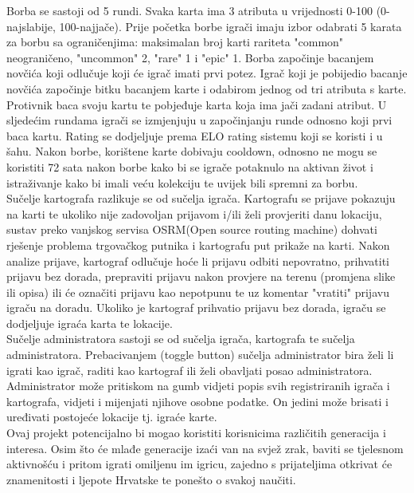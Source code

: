		\textnormal{Borba se sastoji od 5 rundi. Svaka karta ima 3 atributa u vrijednosti 0-100 (0-najslabije, 100-najjače). Prije početka borbe igrači imaju izbor odabrati 5 karata za borbu sa ograničenjima: maksimalan broj karti rariteta "common" neograničeno, "uncommon" 2, "rare" 1 i "epic" 1. Borba započinje bacanjem novčića koji odlučuje koji će igrač imati prvi potez. Igrač koji je pobijedio bacanje novčića započinje bitku bacanjem karte i odabirom jednog od tri atributa s karte. Protivnik baca svoju kartu te pobjeđuje karta koja ima jači zadani atribut. U sljedećim rundama igrači se izmjenjuju u započinjanju runde odnosno koji prvi baca kartu. Rating se dodjeljuje prema ELO rating sistemu koji se koristi i u šahu.}
		\textnormal{Nakon borbe, korištene karte dobivaju cooldown, odnosno ne mogu se koristiti 72 sata nakon borbe kako bi se igrače potaknulo na aktivan život i istraživanje kako bi imali veću kolekciju te uvijek bili spremni za borbu.}\\
		
		\textnormal{Sučelje kartografa razlikuje se od sučelja igrača. Kartografu se prijave pokazuju na karti te ukoliko nije zadovoljan prijavom i/ili želi provjeriti danu lokaciju, sustav preko vanjskog servisa OSRM(Open source routing machine) dohvati rješenje problema trgovačkog putnika i kartografu put prikaže na karti. Nakon analize prijave, kartograf odlučuje hoće li prijavu odbiti nepovratno, prihvatiti prijavu bez dorada, prepraviti prijavu nakon provjere na terenu (promjena slike ili opisa) ili će označiti prijavu kao nepotpunu te uz komentar "vratiti" prijavu igraču na doradu. Ukoliko je kartograf prihvatio prijavu bez dorada, igraču se dodjeljuje igraća karta te lokacije.}\\
		
		\textnormal{Sučelje administratora sastoji se od sučelja igrača, kartografa te sučelja administratora. Prebacivanjem (toggle button) sučelja administrator bira želi li igrati kao igrač, raditi kao kartograf ili želi obavljati posao administratora. Administrator može pritiskom na gumb vidjeti popis svih registriranih igrača i kartografa, vidjeti i mijenjati njihove osobne podatke. On jedini može brisati i uređivati postojeće lokacije tj. igraće karte.}\\
		
		
		\textnormal{Ovaj projekt potencijalno bi mogao koristiti korisnicima različitih generacija i interesa. Osim što će mlađe generacije izaći van na svjež zrak, baviti se tjelesnom aktivnošću i pritom igrati omiljenu im igricu, zajedno s prijateljima otkrivat će znamenitosti i ljepote Hrvatske te ponešto o svakoj naučiti.}
		
